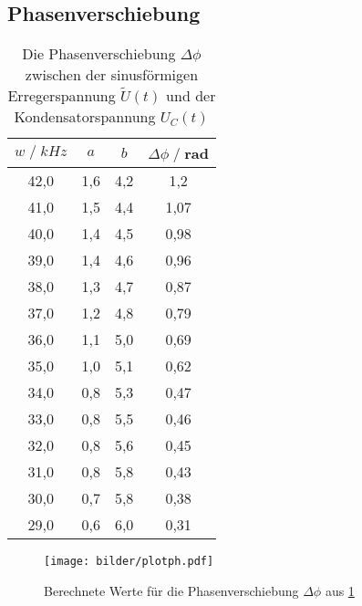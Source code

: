 \subsection{Phasenverschiebung}
\begin{table}
    \centering
    \begin{tabular}{c c c c}
        \toprule
        $w\;/\;kHz$ & $a$ & $b$ & $\Delta \phi\;/\;$rad\\
        \midrule
        42,0 & 1,6 & 4,2 & 1,2 \\
        41,0 & 1,5 & 4,4 & 1,07 \\
        40,0 & 1,4 & 4,5 & 0,98 \\
        39,0 & 1,4 & 4,6 & 0,96 \\
        38,0 & 1,3 & 4,7 & 0,87 \\
        37,0 & 1,2 & 4,8 & 0,79 \\
        36,0 & 1,1 & 5,0 & 0,69 \\
        35,0 & 1,0 & 5,1 & 0,62 \\
        34,0 & 0,8 & 5,3 & 0,47 \\
        33,0 & 0,8 & 5,5 & 0,46 \\
        32,0 & 0,8 & 5,6 & 0,45 \\
        31,0 & 0,8 & 5,8 & 0,43 \\
        30,0 & 0,7 & 5,8 & 0,38 \\
        29,0 & 0,6 & 6,0 & 0,31 \\
        \bottomrule
    \end{tabular}
    \caption{Die Phasenverschiebung $\Delta \phi$ zwischen der sinusförmigen Erregerspannung $\tilde{U}(t)$ und der Kondensatorspannung $U_C(t)$}
    \label{tab:tabelle_phi}
\end{table}
\begin{figure}
    \centering
    \texttt{[image: bilder/plotph.pdf]}
    \caption{
        Berechnete Werte für die Phasenverschiebung $\Delta \phi$ aus \ref{tab:tabelle_phi} 
    }
\end{figure}





\label{sec:Auswertung}
